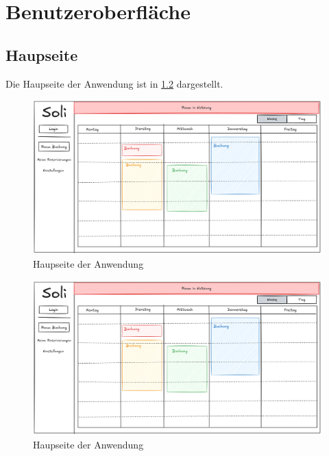 
\chapter{Benutzeroberfläche}
\label{chap:ui}

\section{Haupseite}

Die Haupseite der Anwendung ist in \ref{fig:haupt} dargestellt.

\begin{figure}[ht]
    \centering
    \includegraphics[scale=0.15]{figures/MainPageUI.png}
    \caption{Haupseite der Anwendung}
    \label{fig:haupt}
\end{figure}

\begin{figure}[ht]
    \centering
    \includegraphics[scale=0.15]{figures/MainPageUI.png}
    \caption{Haupseite der Anwendung}
    \label{fig:haupt}
\end{figure}



